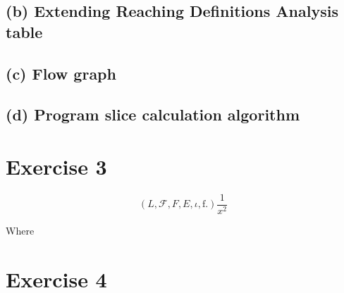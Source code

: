 \documentclass[12pt]{article}
\begin{document}
\subsection*{(b) Extending Reaching Definitions Analysis table}
\subsection*{(c) Flow graph}
\subsection*{(d) Program slice calculation algorithm}
\section*{Exercise 3}

\begin{equation}
  \left(L, \mathcal{F}, F, E, \iota, \mathrm{f}.  \right) \frac{1}{x^2}
  \label{eq:hej}
\end{equation}

Where 

\section*{Exercise 4}
\end{document}
